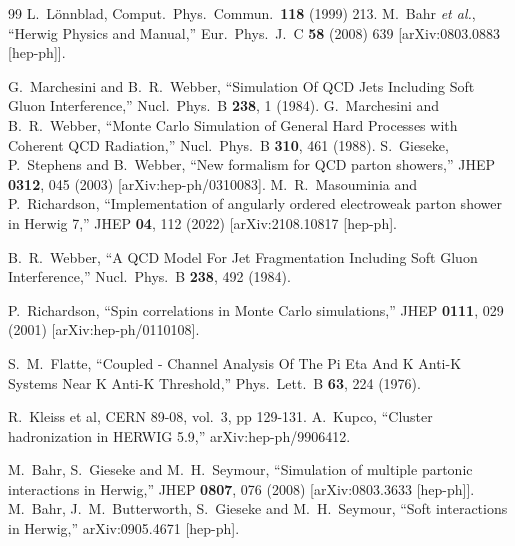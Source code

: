 \documentclass{article}
\begin{document}
\begin{thebibliography}{99}
 L.~L\"onnblad, Comput.~Phys.~Commun.\ {\bf 118} (1999) 213.
  M.~Bahr {\it et al.},
  ``Herwig Physics and Manual,''
  Eur.\ Phys.\ J.\  C {\bf 58} (2008) 639
  [arXiv:0803.0883 [hep-ph]].

  G.~Marchesini and B.~R.~Webber,
  ``Simulation Of QCD Jets Including Soft Gluon Interference,''
  Nucl.\ Phys.\  B {\bf 238}, 1 (1984).
  G.~Marchesini and B.~R.~Webber,
   ``Monte Carlo Simulation of General Hard Processes with Coherent QCD
  Radiation,''
  Nucl.\ Phys.\  B {\bf 310}, 461 (1988).
  S.~Gieseke, P.~Stephens and B.~Webber,
  ``New formalism for QCD parton showers,''
  JHEP {\bf 0312}, 045 (2003)
  [arXiv:hep-ph/0310083].
  M.~R.~Masouminia and P.~Richardson,
  ``Implementation of angularly ordered electroweak parton shower in Herwig 7,''
  JHEP {\bf 04}, 112 (2022)
  [arXiv:2108.10817 [hep-ph].

  B.~R.~Webber,
  ``A QCD Model For Jet Fragmentation Including Soft Gluon Interference,''
  Nucl.\ Phys.\  B {\bf 238}, 492 (1984).

  P.~Richardson,
  ``Spin correlations in Monte Carlo simulations,''
  JHEP {\bf 0111}, 029 (2001)
  [arXiv:hep-ph/0110108].

  S.~M.~Flatte,
   ``Coupled - Channel Analysis Of The Pi Eta And K Anti-K Systems Near K Anti-K
  Threshold,''
  Phys.\ Lett.\  B {\bf 63}, 224 (1976).

 R.~Kleiss et al, CERN 89-08, vol.~3, pp 129-131.
  A.~Kupco,
  ``Cluster hadronization in HERWIG 5.9,''
  arXiv:hep-ph/9906412.

  M.~Bahr, S.~Gieseke and M.~H.~Seymour,
  ``Simulation of multiple partonic interactions in Herwig,''
  JHEP {\bf 0807}, 076 (2008)
  [arXiv:0803.3633 [hep-ph]].
  M.~Bahr, J.~M.~Butterworth, S.~Gieseke and M.~H.~Seymour,
  ``Soft interactions in Herwig,''
  arXiv:0905.4671 [hep-ph].


\end{thebibliography}
\end{document}
